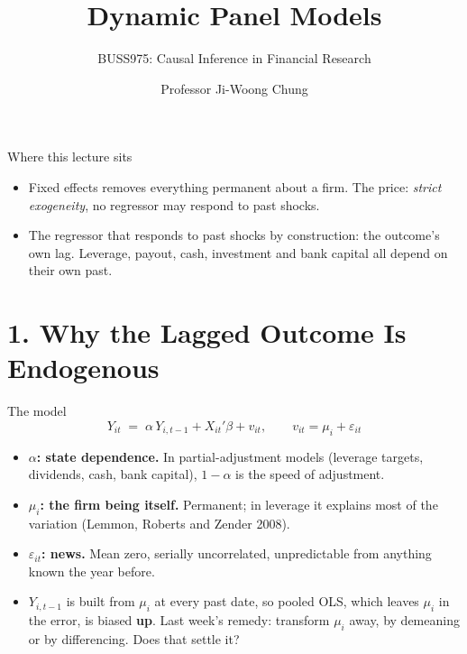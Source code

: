 \documentclass[
  11pt,
  ignorenonframetext,
  aspectratio=169,
]{beamer}
\title{\texorpdfstring{Dynamic Panel Models}{Dynamic Panel Models}}
\subtitle{\texorpdfstring{BUSS975: Causal Inference in Financial
Research}{BUSS975: Causal Inference in Financial Research}}
\author{Professor Ji-Woong Chung}
\date{}
\institute{Korea University}
\providecommand{\tightlist}{%
  \setlength{\itemsep}{0pt}\setlength{\parskip}{0pt}}
\begin{document}
\frame{\titlepage}


\begin{frame}{Where this lecture sits}
\protect{}\label{where-this-lecture-sits}
\begin{itemize}
\tightlist
\item
  Fixed effects removes everything permanent about a firm. The price:
  \emph{strict exogeneity}, no regressor may respond to past shocks.
\item
  The regressor that responds to past shocks by construction: the
  outcome's own lag. Leverage, payout, cash, investment and bank capital
  all depend on their own past.
\end{itemize}
\end{frame}

\section{1. Why the Lagged Outcome Is
Endogenous}\label{why-the-lagged-outcome-is-endogenous}

\begin{frame}{The model}
\protect{}\label{the-model}
\[
Y_{it} \;=\; \alpha\,Y_{i,t-1} + X_{it}'\beta + v_{it}, \qquad v_{it} = \mu_i + \varepsilon_{it}
\]

\begin{itemize}
\tightlist
\item
  \textbf{\(\alpha\): state dependence.} In partial-adjustment models
  (leverage targets, dividends, cash, bank capital), \(1-\alpha\) is the
  speed of adjustment.
\item
  \textbf{\(\mu_i\): the firm being itself.} Permanent; in leverage it
  explains most of the variation (Lemmon, Roberts and Zender 2008).
\item
  \textbf{\(\varepsilon_{it}\): news.} Mean zero, serially uncorrelated,
  unpredictable from anything known the year before.
\end{itemize}

\vspace{0.3em}

\begin{itemize}
\tightlist
\item
  \(Y_{i,t-1}\) is built from \(\mu_i\) at every past date, so pooled
  OLS, which leaves \(\mu_i\) in the error, is biased \textbf{up}. Last
  week's remedy: transform \(\mu_i\) away, by demeaning or by
  differencing. Does that settle it?
\end{itemize}
\end{frame}
\end{document}

